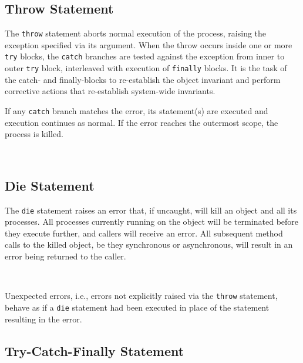 \subsection{Throw Statement}
\label{sec:throw-statement}

The \texttt{throw} statement aborts normal execution of the process, raising
the exception specified via its argument.  When the throw occurs inside one or
more \texttt{try} blocks, the \texttt{catch} branches are tested against the
exception from inner to outer \texttt{try} block, interleaved with execution
of \texttt{finally} blocks.  It is the task of the catch- and finally-blocks
to re-establish the object invariant and perform corrective actions that
re-establish system-wide invariants.

If any \texttt{catch} branch matches the error, its statement(s) are executed
and execution continues as normal.  If the error reaches the outermost scope,
the process is killed.

\begin{abssyntax}
  {}\ \ \TRS{;}
\end{abssyntax}


\subsection{Die Statement}
\label{sec:die-statement}

The \texttt{die} statement raises an error that, if uncaught, will kill an
object and all its processes.  All processes currently running on the object
will be terminated before they execute further, and callers will receive an
error.  All subsequent method calls to the killed object, be they synchronous
or asynchronous, will result in an error being returned to the caller.

\begin{abssyntax}
  {}\ \ \TRS{;}
\end{abssyntax}

Unexpected errors, i.e., errors not explicitly raised via the
\texttt{throw} statement, behave as if a \texttt{die} statement had been
executed in place of the statement resulting in the error.

\subsection{Try-Catch-Finally Statement}
\label{sec:try-catch-finally}

